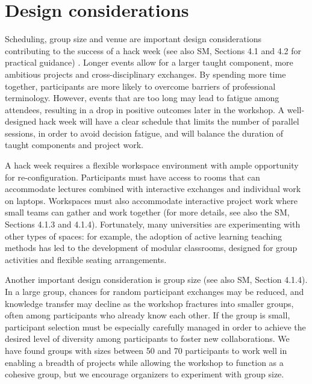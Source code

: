 \section*{Design considerations}

Scheduling, group size and venue are important design considerations contributing to the success of a hack week (see also SM, Sections 4.1 and 4.2 for practical guidance) .   
Longer events allow for a larger taught component, more ambitious projects and cross-disciplinary exchanges. 
By spending more time together, participants are more likely to overcome barriers of professional terminology.
However, events that are too long may lead to fatigue among attendees, resulting in a drop in positive outcomes later in the workshop.
A well-designed hack week will have a clear schedule that limits the number of parallel sessions, in order to avoid decision fatigue, and will balance the duration of taught components and project work. 

A hack week requires a flexible workspace environment with ample opportunity for re-configuration. 
Participants must have access to rooms that can accommodate lectures combined with interactive exchanges and individual work on laptops. 
Workspaces must also accommodate interactive project work where small teams can gather and work together (for more details, see also the SM, Sections 4.1.3 and 4.1.4).    
Fortunately, many universities are experimenting with other types of spaces: for example, the adoption of active learning teaching methods \cite{prince2004} has led to the development of modular classrooms, designed for group activities and flexible seating arrangements.

Another important design consideration is group size (see also SM, Section 4.1.4).
In a large group, chances for random participant exchanges may be reduced, and knowledge transfer may decline as the workshop fractures into smaller groups, often among participants who already know each other.
If the group is small, participant selection must be especially carefully managed in order to achieve the desired level of diversity among participants to foster new collaborations.
We have found groups with sizes between 50 and 70 participants to work well in enabling a breadth of projects while allowing the workshop to function as a cohesive group, but we encourage organizers to experiment with group size.

